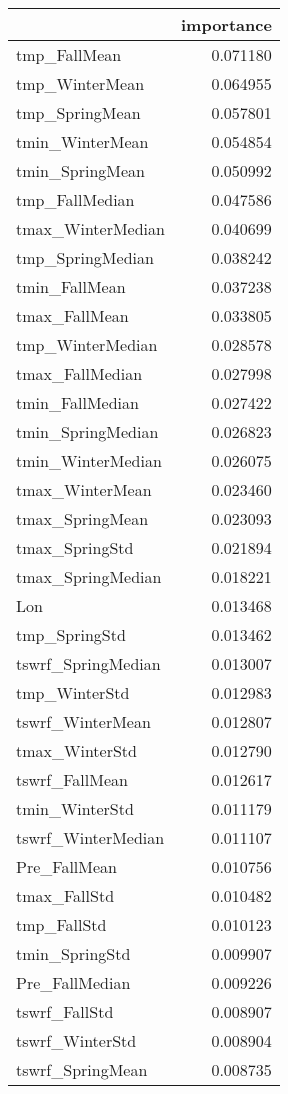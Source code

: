 \begin{tabular}{lr}
\toprule
 & importance \\
\midrule
tmp_FallMean & 0.071180 \\
tmp_WinterMean & 0.064955 \\
tmp_SpringMean & 0.057801 \\
tmin_WinterMean & 0.054854 \\
tmin_SpringMean & 0.050992 \\
tmp_FallMedian & 0.047586 \\
tmax_WinterMedian & 0.040699 \\
tmp_SpringMedian & 0.038242 \\
tmin_FallMean & 0.037238 \\
tmax_FallMean & 0.033805 \\
tmp_WinterMedian & 0.028578 \\
tmax_FallMedian & 0.027998 \\
tmin_FallMedian & 0.027422 \\
tmin_SpringMedian & 0.026823 \\
tmin_WinterMedian & 0.026075 \\
tmax_WinterMean & 0.023460 \\
tmax_SpringMean & 0.023093 \\
tmax_SpringStd & 0.021894 \\
tmax_SpringMedian & 0.018221 \\
Lon & 0.013468 \\
tmp_SpringStd & 0.013462 \\
tswrf_SpringMedian & 0.013007 \\
tmp_WinterStd & 0.012983 \\
tswrf_WinterMean & 0.012807 \\
tmax_WinterStd & 0.012790 \\
tswrf_FallMean & 0.012617 \\
tmin_WinterStd & 0.011179 \\
tswrf_WinterMedian & 0.011107 \\
Pre_FallMean & 0.010756 \\
tmax_FallStd & 0.010482 \\
tmp_FallStd & 0.010123 \\
tmin_SpringStd & 0.009907 \\
Pre_FallMedian & 0.009226 \\
tswrf_FallStd & 0.008907 \\
tswrf_WinterStd & 0.008904 \\
tswrf_SpringMean & 0.008735 \\

\end{tabular}
